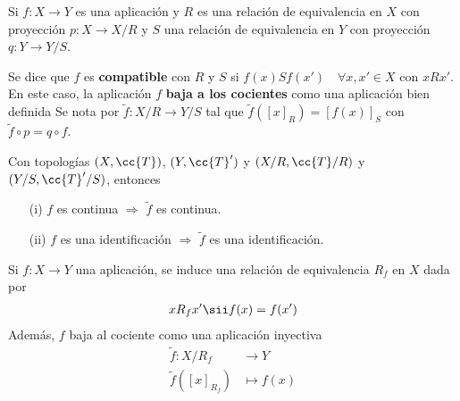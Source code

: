 \begin{definicion}
    Si $f:X \to Y$ es una aplicación y $R$ es una relación de equivalencia en $X$ con proyección $p:X \to X/R$ y $S$ una relación de equivalencia en $Y$ con proyección $q:Y \to Y/S$.

    \begin{figure}[H]
        \centering
    \end{figure}

    Se dice que $f$ es \textbf{compatible} con $R$ y $S$ si $f(x)Sf(x')$\ \ $\forall x, x' \in X$ con $xRx'$. En este caso, la aplicación $f$ \textbf{baja a los cocientes} como una aplicación bien definida Se nota por $\tilde{f}:X/R \to Y/S$ tal que $\tilde{f}([x]_R)=[f(x)]_S$ con $\tilde{f}\circ p = q \circ f$.
    \endsquare
\end{definicion}

\begin{coro}
    Con topologías $(X, \cc{T})$, $(Y, \cc{T}')$ y $(X/R, \cc{T}/R)$ y $(Y/S, \cc{T}'/S)$, entonces 
    \begin{enumerate}
        \item[(i)] $f$ es continua $\Rightarrow$ $\tilde{f}$ es continua.
        \item[(ii)] $f$ es una identificación $\Rightarrow$ $\tilde{f}$ es una identificación.
    \end{enumerate}
    \endsquare
\end{coro}

\begin{definicion}
    Si $f:X\to Y$ una aplicación, se induce una relación de equivalencia $R_f$ en $X$ dada por 
    \begin{align*}
        xR_fx' \sii f(x)=f(x')
    \end{align*}
    Además, $f$ baja al cociente como una aplicación inyectiva
    \begin{align*}
        \tilde{f}: X/R_f &\to Y\\
        \tilde{f}([x]_{R_f}) & \mapsto f(x)
    \end{align*}
    \endsquare
\end{definicion}

